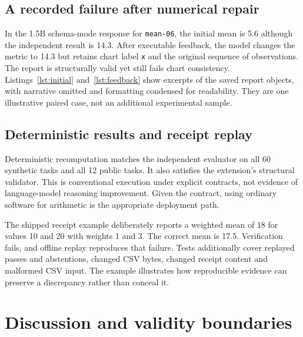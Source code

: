 \subsection{A recorded failure after numerical repair}
In the 1.5B schema-mode response for \texttt{mean-06}, the initial mean is 5.6 although the independent result is 14.3. After executable feedback, the model changes the metric to 14.3 but retains chart label \texttt{x} and the original sequence of observations. The report is structurally valid yet still fails chart consistency. Listings~\ref{lst:initial} and~\ref{lst:feedback} show excerpts of the saved report objects, with narrative omitted and formatting condensed for readability. They are one illustrative paired case, not an additional experimental sample.

\noindent\begin{minipage}[t]{.48\textwidth}

\end{minipage}\hfill
\begin{minipage}[t]{.48\textwidth}

\end{minipage}

\subsection{Deterministic results and receipt replay}
Deterministic recomputation matches the independent evaluator on all 60 synthetic tasks and all 12 public tasks. It also satisfies the extension's structural validator. This is conventional execution under explicit contracts, not evidence of language-model reasoning improvement. Given the contract, using ordinary software for arithmetic is the appropriate deployment path.

The shipped receipt example deliberately reports a weighted mean of 18 for values 10 and 20 with weights 1 and 3. The correct mean is 17.5. Verification fails, and offline replay reproduces that failure. Tests additionally cover replayed passes and abstentions, changed CSV bytes, changed receipt content and malformed CSV input. The example illustrates how reproducible evidence can preserve a discrepancy rather than conceal it.

\section{Discussion and validity boundaries}
